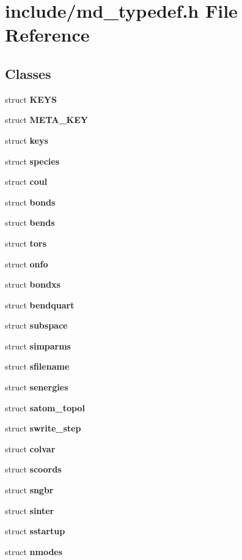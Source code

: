 \section{include/md\_\-typedef.h File Reference}
\label{include_2md__typedef_8h}
\subsection*{Classes}
\begin{CompactItemize}
\item 
struct {\bf KEYS}
\item 
struct {\bf META\_\-KEY}
\item 
struct {\bf keys}
\item 
struct {\bf species}
\item 
struct {\bf coul}
\item 
struct {\bf bonds}
\item 
struct {\bf bends}
\item 
struct {\bf tors}
\item 
struct {\bf onfo}
\item 
struct {\bf bondxs}
\item 
struct {\bf bendquart}
\item 
struct {\bf subspace}
\item 
struct {\bf simparms}
\item 
struct {\bf sfilename}
\item 
struct {\bf senergies}
\item 
struct {\bf satom\_\-topol}
\item 
struct {\bf swrite\_\-step}
\item 
struct {\bf colvar}
\item 
struct {\bf scoords}
\item 
struct {\bf sngbr}
\item 
struct {\bf sinter}
\item 
struct {\bf sstartup}
\item 
struct {\bf nmodes}
\end{CompactItemize}
